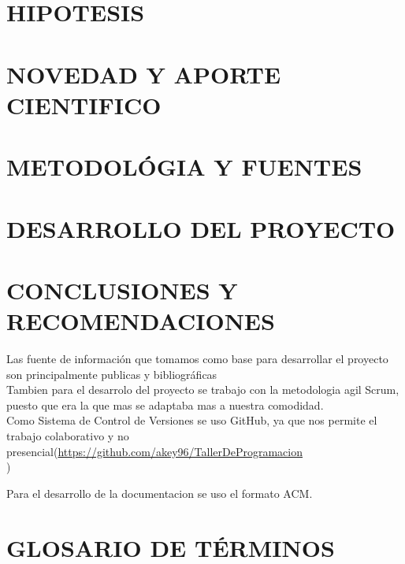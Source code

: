\documentclass[letterpaper,12pt]{article}
\begin{document}
{\section{HIPOTESIS}
\section{NOVEDAD Y APORTE CIENTIFICO}
\section{METODOLÓGIA Y FUENTES}
\section{DESARROLLO DEL PROYECTO}
\section{CONCLUSIONES Y RECOMENDACIONES}






Las fuente de información que tomamos como base para desarrollar el proyecto son principalmente publicas y bibliográficas\\

Tambien para el desarrolo del proyecto se trabajo con la metodologia agil Scrum, puesto que era la que mas se adaptaba mas a nuestra comodidad.\\



Como Sistema de Control de Versiones se uso GitHub, ya que nos permite el trabajo colaborativo y no presencial(\url{https://github.com/akey96/TallerDeProgramacion}\\)


Para el desarrollo de la documentacion se uso el formato ACM.





\newpage
\section{GLOSARIO DE TÉRMINOS}
}
\end{document}
